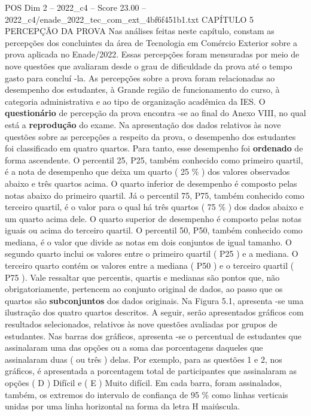 \begin{textsample}{POS Dim 2 – 2022\_c4 – Score 23.00 – 2022\_c4/enade\_2022\_tec\_com\_ext\_4bf6f451b1.txt}  \label{ex:f2_pos_021}
CAPÍTULO 5 PERCEPÇÃO DA PROVA Nas análises feitas neste capítulo, constam as percepções dos concluintes da área de Tecnologia em Comércio Exterior sobre a prova aplicada no Enade/2022.
Essas percepções foram mensuradas por meio de nove questões que avaliaram desde o grau de dificuldade da prova até o tempo gasto para concluí -la.
As percepções sobre a prova foram relacionadas ao desempenho dos estudantes, à Grande região de funcionamento do curso, à categoria administrativa e ao tipo de organização acadêmica da IES.
O \textbf{questionário} de percepção da prova encontra -se ao final do Anexo VIII, no qual está a \textbf{reprodução} do exame.
Na apresentação dos dados relativos às nove questões sobre as percepções a respeito da prova, o desempenho dos estudantes foi classificado em quatro quartos.
Para tanto, esse desempenho foi \textbf{ordenado} de forma ascendente.
O percentil 25, P25, também conhecido como primeiro quartil, é a nota de desempenho que deixa um quarto ( 25 \% ) dos valores observados abaixo e três quartos acima.
O quarto inferior de desempenho é composto pelas notas abaixo do primeiro quartil.
Já o percentil 75, P75, também conhecido como terceiro quartil, é o valor para o qual há três quartos ( 75 \% ) dos dados abaixo e um quarto acima dele.
O quarto superior de desempenho é composto pelas notas iguais ou acima do terceiro quartil.
O percentil 50, P50, também conhecido como mediana, é o valor que divide as notas em dois conjuntos de igual tamanho.
O segundo quarto inclui os valores entre o primeiro quartil ( P25 ) e a mediana.
O terceiro quarto contém os valores entre a mediana ( P50 ) e o terceiro quartil ( P75 ).
Vale ressaltar que percentis, quartis e medianas são pontos que, não obrigatoriamente, pertencem ao conjunto original de dados, ao passo que os quartos são \textbf{subconjuntos} dos dados originais.
Na Figura 5.1, apresenta -se uma ilustração dos quatro quartos descritos.
A seguir, serão apresentados gráficos com resultados selecionados, relativos às nove questões avaliadas por grupos de estudantes.
Nas barras dos gráficos, apresenta -se o percentual de estudantes que assinalaram uma das opções ou a soma das porcentagens daqueles que assinalaram duas ( ou três ) delas.
Por exemplo, para as questões 1 e 2, nos gráficos, é apresentada a porcentagem total de participantes que assinalaram as opções ( D ) Difícil e ( E ) Muito difícil.
Em cada barra, foram assinalados, também, os extremos do intervalo de confiança de 95 \% como linhas verticais unidas por uma linha horizontal na forma da letra H maiúscula.

\end{textsample}
